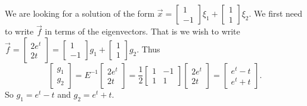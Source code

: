 \documentclass[12pt]{book}
\begin{document}
\begin{example}
We are looking for a solution of the form $\vec{x} = 
\left[ \begin{smallmatrix}
1 \\
-1
\end{smallmatrix} \right] \xi_1 +
\left[ \begin{smallmatrix}
1 \\
1
\end{smallmatrix} \right] \xi_2$.  We first need to write $\vec{f}$
in terms of the eigenvectors.
That is we wish to write $\vec{f} = 
\left[ \begin{smallmatrix}
2e^t \\
2t
\end{smallmatrix} \right] = 
\left[ \begin{smallmatrix}
1 \\
-1
\end{smallmatrix} \right] g_1 +
\left[ \begin{smallmatrix}
1 \\
1
\end{smallmatrix} \right] g_2$.  Thus
\begin{equation*}
\begin{bmatrix}
g_1 \\
g_2
\end{bmatrix} = 
E^{-1}
\begin{bmatrix}
2e^t \\
2t
\end{bmatrix}
=
\frac{1}{2}
\begin{bmatrix}
1 & -1 \\
1 & 1
\end{bmatrix}
\begin{bmatrix}
2e^t \\
2t
\end{bmatrix}
=
\begin{bmatrix}
e^t-t \\
e^t+t
\end{bmatrix} .
\end{equation*}
So $g_1 = e^t-t$ and $g_2 = e^t+t$.


\end{example}
\end{document}
